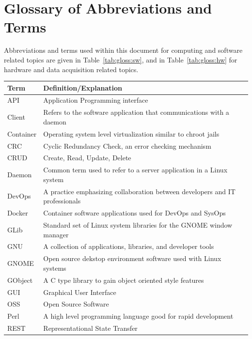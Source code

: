 \documentclass[11pt]{article}
\begin{document}
  \section{Glossary of Abbreviations and Terms}\label{app:glossary}

    Abbreviations and terms used within this document for computing and
    software related topics are given in Table~\ref{tab:gloss:sw}, and in
    Table~\ref{tab:gloss:hw} for hardware and data acquisition related topics.

    \begin{table}[H]
      \centering
      \begin{tabular}{l p{10cm}}
        \toprule
        Term & Definition/Explanation \\ [0.5ex]
        \midrule
        API & Application Programming interface \\
        Client & Refers to the software application that communications with a daemon \\
        Container & Operating system level virtualization similar to chroot jails \\
        CRC & Cyclic Redundancy Check, an error checking mechanism \\
        CRUD & Create, Read, Update, Delete \\
        Daemon & Common term used to refer to a server application in a Linux system \\
        DevOps & A practice emphasizing collaboration between developers and IT professionals \\
        Docker & Container software applications used for DevOps and SysOps \\
        GLib & Standard set of Linux system libraries for the GNOME window manager \\
        GNU & A collection of applications, libraries, and developer tools \\
        GNOME & Open source dekstop environment software used with Linux systems \\
        GObject & A C type library to gain object oriented style features \\
        GUI & Graphical User Interface \\
        OSS & Open Source Software \\
        Perl & A high level programming language good for rapid development \\
        REST & Representational State Transfer \\

\end{tabular}
\end{table}
\end{document}
